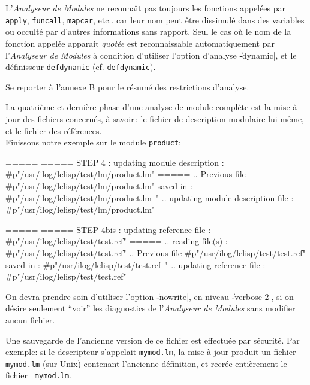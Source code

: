 L'{\em Analyseur de Modules} ne reconna\^{\i}t pas toujours les fonctions
appel\'{e}es par {\tt 
apply}, {\tt funcall}, {\tt mapcar}, etc.. car leur nom peut \^{e}tre
dissimul\'{e} dans des variables ou occult\'{e} par d'autres informations
sans rapport. Seul le cas o\`{u} le nom de la fonction appel\'{e}e apparait
{\em quot\'{e}e} est reconnaissable automatiquement par l'{\em Analyseur de
Modules} \`{a} condition d'utiliser l'option d'analyse \|-dynamic|, et le
d\'{e}finisseur {\tt defdynamic} (cf. {\tt defdynamic}).


Se reporter \`{a} l'annexe B pour le r\'{e}sum\'{e} des restrictions d'analyse.


La quatri\`{e}me et derni\`{e}re phase d'une analyse de module compl\`{e}te est
la mise \`{a} jour des fichiers concern\'{e}s, \`{a} savoir\,: le fichier de
description modulaire lui-m\^{e}me, et le fichier des r\'{e}f\'{e}rences.\\
Finissons notre exemple sur le module {\tt product}:

\begin{Longcode*}
=====
===== STEP 4 : updating module description : #p"/usr/ilog/lelisp/test/lm/product.lm"
=====
.. Previous file #p"/usr/ilog/lelisp/test/lm/product.lm" saved in :
#p"/usr/ilog/lelisp/test/lm/product.lm~"
.. updating module description file : #p"/usr/ilog/lelisp/test/lm/product.lm"

=====
===== STEP 4bis : updating reference file : #p"/usr/ilog/lelisp/test/test.ref"
=====
.. reading file(s) : #p"/usr/ilog/lelisp/test/test.ref"
.. Previous file #p"/usr/ilog/lelisp/test/test.ref" saved in :
#p"/usr/ilog/lelisp/test/test.ref~"
.. updating reference file : #p"/usr/ilog/lelisp/test/test.ref"
\end{Longcode*}

On devra prendre soin d'utiliser l'option \|-nowrite|, en niveau
\|-verbose 2|, si on d\'{e}sire
seulement ``voir{''} les diagnostics de l'{\em Analyseur de Modules}
sans modifier aucun fichier.

Une sauvegarde de l'ancienne version de ce
fichier est effectu\'{e}e par s\'{e}curit\'{e}.  Par exemple: si le descripteur
s'appelait {\tt mymod.lm}, la mise \`{a} jour
produit un fichier {\tt mymod.lm} (sur Unix) contenant
l'ancienne d\'{e}finition, et recr\'{e}e enti\`{e}rement le fichier {\tt
mymod.lm}.


